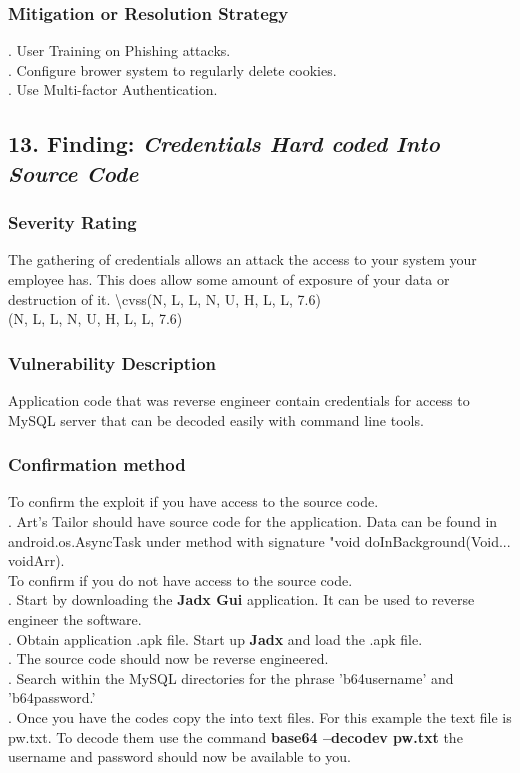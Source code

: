 \documentclass[notitlepage]{article}
\begin{document}
	\subsubsection{Mitigation or Resolution Strategy}
	. User Training on Phishing attacks. \\
	. Configure brower system to regularly delete cookies. \\
	. Use Multi-factor Authentication.\\
	
		\subsection{13. Finding: \emph{Credentials Hard coded Into Source Code}}
	
	\subsubsection{Severity Rating}
	\indent The gathering of credentials allows an attack the access to your system your employee has. This does allow some amount of exposure of your data or destruction of it. 
	\textbackslash cvss(N, L, L, N, U, H, L, L, 7.6)\\
	\cvss(N, L, L, N, U, H, L, L, 7.6) \\
	
	\subsubsection{Vulnerability Description}
	\indent Application code that was reverse engineer contain credentials for access to MySQL server that can be decoded easily with command line tools. \\
	
	\subsubsection{Confirmation method}
	To confirm the exploit if you have access to the source code. \\
	. Art's Tailor should have source code for the application. Data can be found in android.os.AsyncTask under method with signature "void doInBackground(Void... voidArr).\\
	To confirm if you do not have access to the source code.\\
	. Start by downloading the \textbf{Jadx Gui} application. It can be used to reverse engineer the software. \\
	. Obtain application .apk file.  Start up \textbf{Jadx} and load the .apk file. \\
	. The source code should now be reverse engineered.  \\
	. Search within the MySQL directories for the phrase 'b64username' and 'b64password.' \\
	. Once you have the codes copy the into text files. For this example the text file is pw.txt. To decode them use the command \textbf{base64 --decodev pw.txt}
	\indent the username and password should now be available to you. 
	
\end{document}
